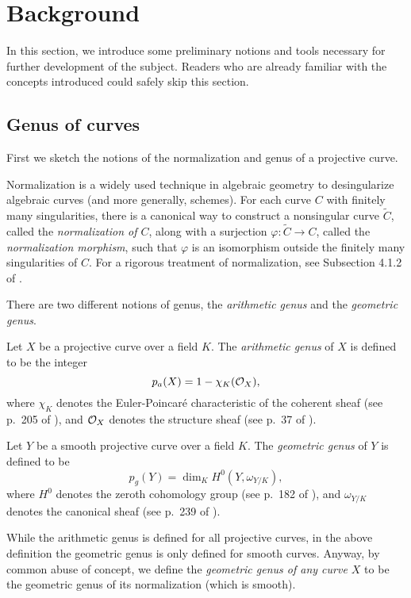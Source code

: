 \section{Background}
\label{sec:pre}

In this section, we introduce some preliminary notions and tools
necessary for further development of the subject. Readers who are
already familiar with the concepts introduced could safely skip this
section.

\subsection{Genus of curves}

First we sketch the notions of the normalization and genus of a
projective curve.

Normalization is a widely used technique in algebraic geometry to
desingularize algebraic curves (and more generally, schemes). For each
curve $C$ with finitely many singularities, there is a canonical way
to construct a nonsingular curve $\tilde{C}$, called the
\emph{normalization of $C$}, along with a surjection $\varphi:
\tilde{C} \to C$, called the \emph{normalization morphism}, such that
$\varphi$ is an isomorphism outside the finitely many singularities of
$C$. For a rigorous treatment of normalization, see Subsection 4.1.2
of \cite{MR1917232}.

There are two different notions of genus, the \emph{arithmetic genus}
and the \emph{geometric genus}.

\begin{definition}
  Let $X$ be a projective curve over a field $K$. The \emph{arithmetic
    genus} of $X$ is defined to be the integer
  \[
  p_a(X) = 1 - \chi_K(\mathcal{O}_X),
  \]
  where $\chi_K$ denotes the Euler-Poincar\'e characteristic of the
  coherent sheaf (see p.~205 of \cite{MR1917232}), and $\mathcal{O}_X$ denotes
  the structure sheaf (see p.~37 of \cite{MR1917232}).
\end{definition}

\begin{definition}
  Let $Y$ be a smooth projective curve over a field $K$. The
  \emph{geometric genus} of $Y$ is defined to be
  \[
  p_g(Y) = \dim_K H^0(Y, \omega_{Y/K}),
  \]
  where $H^0$ denotes the zeroth cohomology group (see p.~182 of
  \cite{MR1917232}), and $\omega_{Y/K}$ denotes the canonical sheaf
  (see p.~239 of \cite{MR1917232}).
\end{definition}

\begin{remark}
  \label{rem:abuse}
  While the arithmetic genus is defined for all projective curves, in
  the above definition the geometric genus is only defined for smooth
  curves. Anyway, by common abuse of concept, we define the
  \emph{geometric genus of any curve $X$} to be the geometric genus of
  its normalization (which is smooth).
\end{remark}

